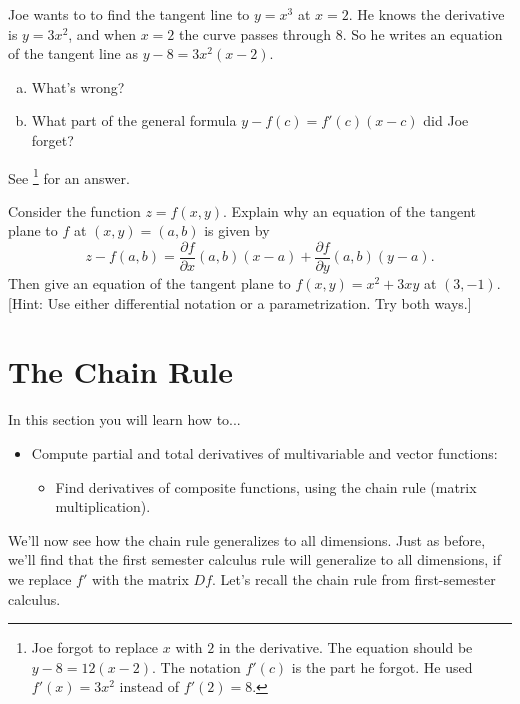 \begin{review*}
 Joe wants to to find the tangent line to $y=x^3$ at $x=2$.  He knows the derivative is $y=3x^2$, and when $x=2$ the curve passes through $8$.  So he writes an equation of the tangent line as $y-8=3x^2(x-2)$. 
	\begin{enumerate}[a)]
		\item What's wrong?  
		\item What part of the general formula $y-f(c) = f'(c) (x-c)$ did Joe forget?  
	\end{enumerate}
See \footnote{Joe forgot to replace $x$ with $2$ in the derivative. The equation should be $y-8=12(x-2)$.  The notation $f'(c)$ is the part he forgot.  He used $f'(x)=3x^2$ instead of $f'(2)=8$.} for an answer.

\end{review*}



\begin{problem}
 Consider the function $z=f(x,y)$. Explain why an equation of the tangent plane to $f$ at $(x,y)=(a,b)$ is given by  
$$z-f(a,b) = \frac{\partial f}{\partial x}(a,b) (x-a) +  \frac{\partial f}{\partial y}(a,b) (y-a).$$
Then give an equation of the tangent plane to $f(x,y) = x^2+3xy$ at $(3,-1)$. 
[Hint: Use either differential notation or a parametrization. Try both ways.]
\end{problem}

%


\section{The Chain Rule}

In this section you will learn how to...
\begin{itemize}
\item Compute partial and total derivatives of multivariable and vector functions:
\begin{itemize}
\item Find derivatives of composite functions, using the chain rule (matrix multiplication).
\end{itemize}
\end{itemize}

We'll now see how the chain rule generalizes to all dimensions.  Just as before, we'll find that the first semester calculus rule will generalize to all dimensions, if we replace $f'$ with the matrix $Df$. 
Let's recall the chain rule from first-semester calculus. 

